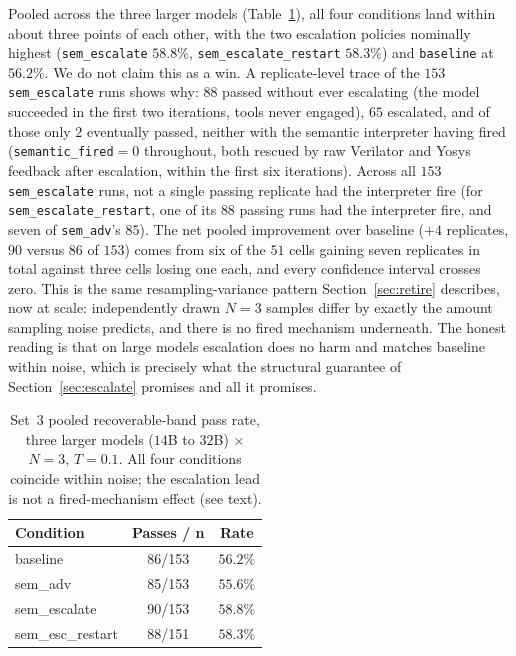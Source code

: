\documentclass[11pt]{article}
\begin{document}
Pooled across the three larger models (Table~\ref{tab:set3-pooled}), all four
conditions land within about three points of each other, with the two
escalation policies nominally highest (\texttt{sem\_escalate} $58.8\%$,
\texttt{sem\_escalate\_restart} $58.3\%$) and \texttt{baseline} at $56.2\%$.
We do not claim this as a win. A replicate-level trace of the $153$
\texttt{sem\_escalate} runs shows why: $88$ passed without ever escalating
(the model succeeded in the first two iterations, tools never engaged), $65$
escalated, and of those only $2$ eventually passed, neither with the semantic
interpreter having fired (\texttt{semantic\_fired}${=}0$ throughout, both
rescued by raw Verilator and Yosys feedback after escalation, within the first
six iterations). Across all $153$ \texttt{sem\_escalate} runs, not a single
passing replicate had the interpreter fire (for
\texttt{sem\_escalate\_restart}, one of its $88$ passing runs had the
interpreter fire, and seven of \texttt{sem\_adv}'s $85$). The net pooled
improvement over baseline ($+4$ replicates, $90$ versus $86$ of $153$) comes
from six of the $51$ cells gaining seven replicates in total against three
cells losing one each, and every confidence interval crosses zero. This is the
same resampling-variance pattern Section~\ref{sec:retire} describes, now at
scale: independently drawn $N{=}3$ samples differ by exactly the amount
sampling noise predicts, and there is no fired mechanism underneath. The
honest reading is that on large models escalation does no harm and matches
baseline within noise, which is precisely what the structural guarantee of
Section~\ref{sec:escalate} promises and all it promises.

\begin{table}[htbp]
\centering
\caption{Set~$3$ pooled recoverable-band pass rate, three larger models
($14$B to $32$B) $\times$ $N{=}3$, $T{=}0.1$. All four conditions coincide
within noise; the escalation lead is not a fired-mechanism effect (see text).}
\label{tab:set3-pooled}
\small
\begin{tabularx}{\linewidth}{@{} X c c @{}}
\toprule
\textbf{Condition} & \textbf{Passes / n} & \textbf{Rate} \\
\midrule
baseline                     & 86/153 & $56.2\%$ \\
sem\_adv                     & 85/153 & $55.6\%$ \\
sem\_escalate                & 90/153 & $58.8\%$ \\
sem\_esc\_restart            & 88/151 & $58.3\%$ \\
\bottomrule
\end{tabularx}
\end{table}
\end{document}
